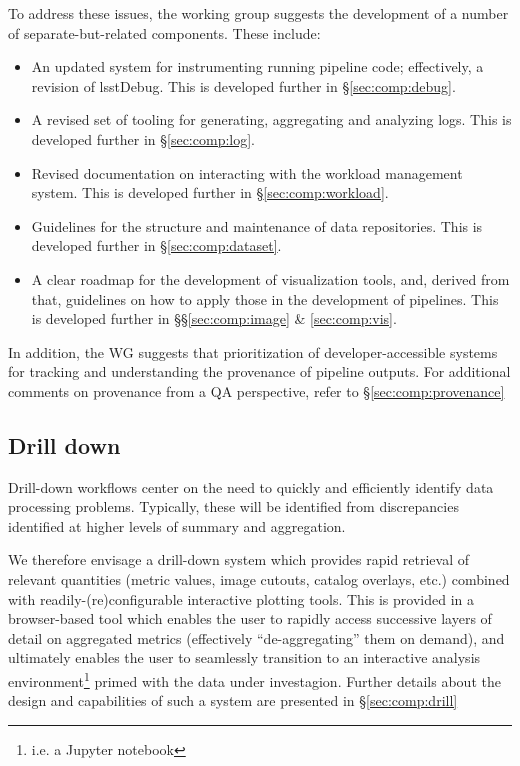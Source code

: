 To address these issues, the working group suggests the development of a
number of separate-but-related components. These include:

\begin{itemize}

  \item{An updated system for instrumenting running pipeline code;
  effectively, a revision of lsstDebug. This is developed further in
  \S\ref{sec:comp:debug}.}

  \item{A revised set of tooling for generating, aggregating and analyzing
  logs. This is developed further in \S\ref{sec:comp:log}.}

  \item{Revised documentation on interacting with the workload management
  system. This is developed further in \S\ref{sec:comp:workload}.}

  \item{Guidelines for the structure and maintenance of data repositories.
  This is developed further in \S\ref{sec:comp:dataset}.}

  \item{A clear roadmap for the development of visualization tools, and,
  derived from that, guidelines on how to apply those in the development of
  pipelines. This is developed further in \S\S\ref{sec:comp:image} \&
  \ref{sec:comp:vis}.}

\end{itemize}

In addition, the WG suggests that prioritization of developer-accessible
systems for tracking and understanding the provenance of pipeline outputs. For
additional comments on provenance from a QA perspective, refer to
\S\ref{sec:comp:provenance}

\subsection{Drill down}
\label{sec:design:drill}

Drill-down workflows center on the need to quickly and efficiently identify
data processing problems. Typically, these will be identified from
discrepancies identified at higher levels of summary and aggregation.

We therefore envisage a drill-down system which provides rapid retrieval of
relevant quantities (metric values, image cutouts, catalog overlays, etc.)
combined with readily-(re)configurable interactive plotting tools. This is
provided in a browser-based tool which enables the user to rapidly access
successive layers of detail on aggregated metrics (effectively
``de-aggregating'' them on demand), and ultimately enables the user to
seamlessly transition to an interactive analysis environment\footnote{i.e. a
Jupyter notebook} primed with the data under investagion. Further details
about the design and capabilities of such a system are presented in
\S\ref{sec:comp:drill}

